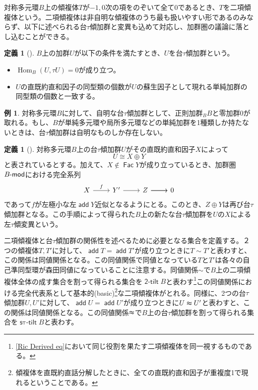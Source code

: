 \documentclass[a4paper,uplatex,dvipdfmx]{jsarticle}
\theoremstyle{definition}
\newtheorem{definition}[theorem]{定義}
\newtheorem{example}[theorem]{例}
\newcommand{\lmod}{\operatorname{\mathsf{\hspace{-2pt}-mod}}}
\newcommand{\twotilt}{\operatorname{\mathsf{2-tilt}}}
\newcommand{\Hom}{\operatorname{Hom}\nolimits}
\newcommand{\add}{\operatorname{\mathsf{add}}}
\newcommand{\stautilt}{\operatorname{\mathsf{s\tau-tilt}}}
\newcommand{\Fac}{\operatorname{\mathsf{Fac}}}
\begin{document}
対称多元環\(B\)上の傾複体\(T\)が\(-1,0\)次の項をのぞいて全て\(0\)であるとき、\(T\)を二項傾複体という。二項傾複体は非自明な傾複体のうち最も扱いやすい形であるのみならず、以下に述べられる台\(\tau\)傾加群と変異も込めて対応し、加群圏の議論に落とし込むことができる。
\begin{definition}[{\cite{MR3187626}}]
  \(B\)上の加群\(U\)が以下の条件を満たすとき、\(U\)を台\(\tau\)傾加群という。
  \begin{itemize}
    \item \(\Hom_B(U,\tau U)=0\)が成り立つ。
    \item \(U\)の直既約直和因子の同型類の個数が\(U\)の蘇生因子として現れる単純加群の同型類の個数と一致する。
  \end{itemize}
\end{definition}
\begin{example}
  対称多元環\(B\)に対して、自明な台\(\tau\)傾加群として、正則加群\({}_BB\)と零加群\(0\)が取れる。もし、\(B\)が単純多元環や局所多元環などの単純加群を1種類しか持たないときは、台\(\tau\)傾加群は自明なものしか存在しない。
\end{example}
\begin{definition}[{\cite{MR3187626}}]
  対称多元環\(B\)上の台\(\tau\)傾加群\(U\)がその直既約直和因子\(X\)によって
  \begin{equation}
    U\cong X\oplus Y
  \end{equation}
  と表されているとする。加えて、\(X \notin \Fac Y\)が成り立っているとき、加群圏\(B\lmod\)における完全系列
  \begin{equation}
    \begin{tikzcd}
      X\ar[r,"f"]&Y'\ar[r]&Z\ar[r]\ar[r]&0
    \end{tikzcd}
  \end{equation}
  であって\(f\)が左極小な左\(\add Y\)近似となるようにとる。このとき、\(Z\oplus Y\)は再び台\(\tau\)傾加群となる。この手順によって得られた\(B\)上の新たな台\(\tau\)傾加群を\(U\)の\(X\)による左\(\tau\)傾変異という。
\end{definition}
二項傾複体と台\(\tau\)傾加群の関係性を述べるために必要となる集合を定義する。２つの傾複体\(T, T'\)に対して、\(\add T=\add T'\)が成り立つときに\(T\sim T'\)と表わすと、この関係は同値関係となる。この同値関係で同値となっている\(T\)と\(T'\)は各々の自己準同型環が森田同値になっていることに注意する。同値関係\(\sim\)で\(B\)上の二項傾複体全体の成す集合を割って得られる集合を\(\twotilt B\)と表わす\footnote{\cref{Ric Derived eq}において同じ役割を果たす二項傾複体を同一視するものである。}この同値関係における完全代表系として基本的(basic)\footnote{傾複体を直既約直話分解したときに、全ての直既約直和因子が重複度1で現れるということである。}な二項傾複体がとれる。同様に、2つの台\(\tau\)傾加群\(U, U'\)に対して、\(\add U=\add U'\)が成り立つときに\(U\thickapprox U'\)と表わすと、この関係は同値関係となる。この同値関係\(\thickapprox\)で\(B\)上の台\(\tau\)傾加群を割って得られる集合を\(\stautilt B\)と表わす。
\end{document}
